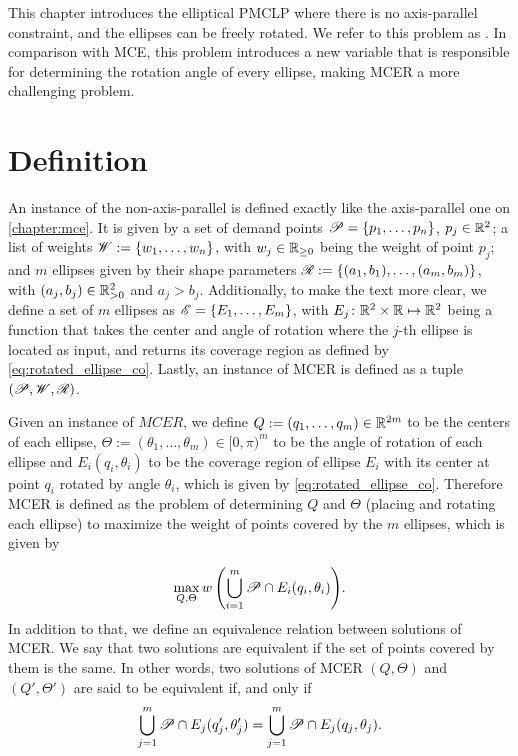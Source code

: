 This chapter introduces the elliptical PMCLP where there is no axis-parallel constraint, and the ellipses can be freely rotated. We refer to this problem as . In comparison with MCE, this problem introduces a new variable that is responsible for determining the rotation angle of every ellipse, making MCER a more challenging problem.

\section{Definition}

An instance of the non-axis-parallel is defined exactly like the axis-parallel one on \autoref{chapter:mce}. It is given by a set of demand points $\mathscr{P}=\{p_1, \dots, p_n\}$, $p_j\in\mathbb{R}^2$; a list of weights $\mathscr{W}:=\{w_1, \dots, w_n\}$, with $w_j\in\mathbb{R}_{\ge0}$ being the weight of point $p_j$;
and $m$ ellipses given by their shape parameters $\mathscr{R}:=\{(a_1, b_1), \dots, (a_m, b_m)\}$, with $(a_j, b_j)\in\mathbb{R}_{>0}^2$ and $a_j>b_j$.
Additionally, to make the text more clear, we define a set of $m$ ellipses as $\mathscr{E} = \{E_1, \dots, E_m\}$, with $E_j\colon \mathbb{R}^2\times\mathbb{R} \mapsto \mathbb{R}^2$ being a function that takes the center and angle of rotation where the $j$-th ellipse is located as input, and returns its coverage region as defined by \autoref{eq:rotated_ellipse_co}.
Lastly, an instance of MCER is defined as a tuple $(\mathscr{P}, \mathscr{W}, \mathscr{R})$.

Given an instance of $MCER$, we define $Q:=(q_1, \dots, q_m) \in \mathbb{R}^{2m}$ to be the centers of each ellipse, $\Theta:=(\theta_1, \dots, \theta_m) \in [0, \pi)^m$ to be the angle of rotation of each ellipse and $E_i(q_i, \theta_i)$ to be the coverage region of ellipse $E_i$ with its center at point $q_i$ rotated by angle $\theta_i$, which is given by \autoref{eq:rotated_ellipse_co}. Therefore MCER is defined as the problem of determining $Q$ and $\Theta$ (placing and rotating each ellipse) to maximize the weight of points covered by the $m$ ellipses, which is given by

\begin{equation}\label{eq:optMCEn}
\max_{Q, \Theta}{w\left(\bigcup_{i=1}^{m} \mathscr{P} \cap E_i(q_i, \theta_i)\right)}.
\end{equation}
In addition to that, we define an equivalence relation between solutions of MCER. We say that two solutions are equivalent if the set of points covered by them is the same. In other words, two solutions of MCER $(Q, \Theta)$ and $(Q', \Theta')$ are said to be equivalent if, and only if 
$$\bigcup_{j=1}^m\mathscr{P} \cap E_j(q_j', \theta_j') = \bigcup_{j=1}^m\mathscr{P} \cap E_j(q_j, \theta_j).$$

